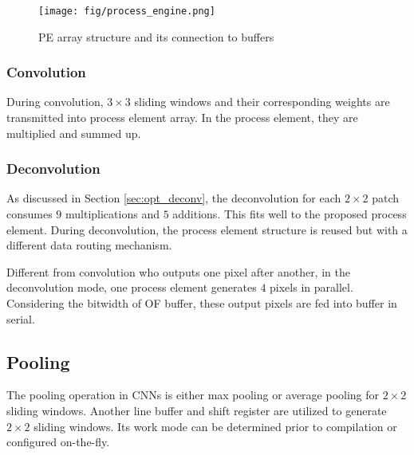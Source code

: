 \documentclass[conference]{IEEEtran}
\begin{document}
\begin{figure}[htbp]
	\centering
	\texttt{[image: fig/process\_engine.png]}
	\caption{PE array structure and its connection to buffers}
	\label{fig:conv}
\end{figure}

\subsubsection{Convolution}
During convolution, $3\times 3$ sliding windows and their corresponding weights are transmitted into process element array. In the process element, they are multiplied and summed up.

\begin{comment}
\begin{figure}[htbp]
	\centering
	\texttt{[image: fig/pe\_deconv.png]}
	\caption{Block diagram of process element}
	\label{fig:deconv}
\end{figure}
\end{comment}

\subsubsection{Deconvolution}
As discussed in Section \ref{sec:opt_deconv}, the deconvolution for each $2\times 2$  patch consumes $9$ multiplications and $5$ additions. This fits well to the proposed process element. During deconvolution, the process element structure is reused but with a different data routing mechanism.

Different from convolution who outputs one pixel after another, in the deconvolution mode, one process element generates $4$ pixels in parallel. Considering the bitwidth of OF buffer, these output pixels are fed into buffer in serial.

\subsection{Pooling}
The pooling operation in CNNs is either max pooling or average pooling for $2\times 2$ sliding windows. Another line buffer and shift register are utilized to generate $2\times 2$ sliding windows. Its work mode can be determined prior to compilation or configured on-the-fly.

\begin{comment}
\begin{figure}[htbp]
	\centering
	\texttt{[image: fig/max\_pooling.png]}
	\caption{Block diagram of max-pooling}
	\label{fig:maxp}
\end{figure}
\end{comment}
\end{document}
